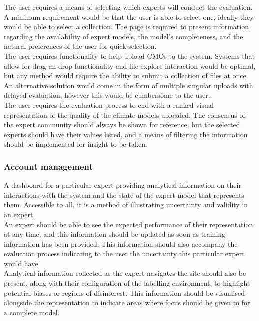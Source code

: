 \documentclass{ecmm427_assignment}
\begin{document}
\quad The user requires a means of selecting which experts will conduct the evaluation. A minimum requirement would be that the user is able to select one, ideally they would be able to select a collection. The page is required to present information regarding the availability of expert models, the model's completeness, and the natural preferences of the user for quick selection.\\

\quad The user requires functionality to help upload CMOs to the system. Systems that allow for drag-an-drop functionality and file explore interaction would be optimal, but any method would require the ability to submit a collection of files at once. An alternative solution would come in the form of multiple singular uploads with delayed evaluation, however this would be cumbersome to the user.\\

\quad The user requires the evaluation process to end with a ranked visual representation of the quality of the climate models uploaded. The consensus of the expert community should always be shown for reference, but the selected experts should have their values listed, and a means of filtering the information should be implemented for insight to be taken.

\subsubsection{Account management}

\quad A dashboard for a particular expert providing analytical information on their interactions with the system and the state of the expert model that represents them. Accessible to all, it is a method of illustrating uncertainty and validity in an expert.\\

\quad An expert should be able to see the expected performance of their representation at any time, and this information should be updated as soon as training information has been provided. This information should also accompany the evaluation process indicating to the user the uncertainty this particular expert would have.\\

\quad Analytical information collected as the expert navigates the site should also be present, along with their configuration of the labelling environment, to highlight potential biases or regions of disinterest. This information should be visualised alongside the representation to indicate areas where focus should be given to for a complete model.\\
\end{document}
